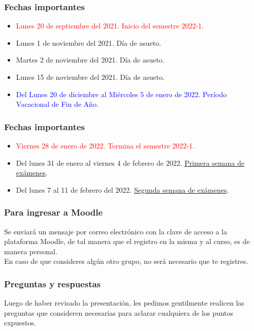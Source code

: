 \begin{frame}
\frametitle{Fechas importantes}
\begin{itemize}
\item \textcolor{red}{Lunes 20 de septiembre del 2021. Inicio del semestre 2022-1.}
\item Lunes 1 de noviembre del 2021. Día de asueto.
\item Martes 2 de noviembre del 2021. Día de asueto.
\item Lunes 15 de noviembre del 2021. Día de asueto.
\item \textcolor{blue}{Del Lunes 20 de diciembre al Miércoles 5 de enero de 2022. Período Vacacional de Fin de Año.}
\end{itemize}
\end{frame}
\begin{frame}
\frametitle{Fechas importantes}
\begin{itemize}
\item \textcolor{red}{Viernes 28 de enero de 2022. Termina el semestre 2022-1.}
\item Del lunes 31 de enero al viernes 4 de febrero de 2022. \underline{Primera semana de exámenes}.
\item Del lunes 7 al 11 de febrero del 2022. \underline{Segunda semana de exámenes}.
\end{itemize}
\end{frame}
\begin{frame}
\frametitle{Para ingresar a Moodle}
Se enviará un mensaje por correo electrónico con la clave de acceso a la plataforma Moodle, de tal manera que el registro en la misma y al curso, es de manera personal.
\\
\bigskip
En caso de que consideres algún otro grupo, no será necesario que te registres. %
\end{frame}
\begin{frame}
\frametitle{Preguntas y respuestas}
Luego de haber revisado la presentación, les pedimos gentilmente realicen las preguntas que consideren necesarias para aclarar cualquiera de los puntos expuestos.
\end{frame}
